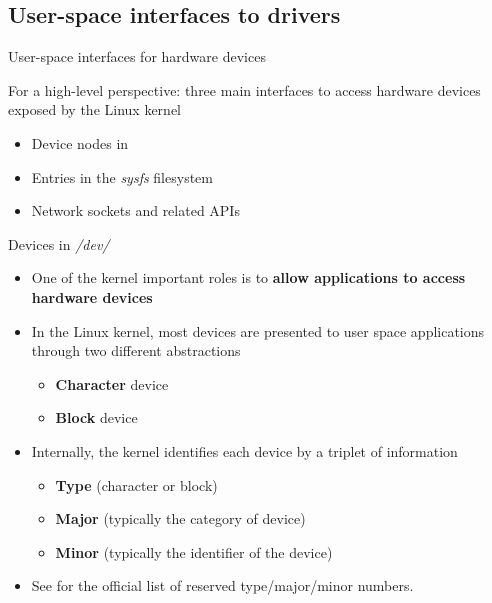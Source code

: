 \subsection{User-space interfaces to drivers}

\begin{frame}{User-space interfaces for hardware devices}

  For a high-level perspective: three main interfaces to access
  hardware devices exposed by the Linux kernel

  \begin{itemize}
  \item Device nodes in 
  \item Entries in the {\em sysfs} filesystem
  \item Network sockets and related APIs
  \end{itemize}
\end{frame}

\begin{frame}{Devices in {\em /dev/}}
  \begin{itemize}
  \item One of the kernel important roles is to {\bf allow applications
      to access hardware devices}
  \item In the Linux kernel, most devices are presented to user space
    applications through two different abstractions
    \begin{itemize}
    \item {\bf Character} device
    \item {\bf Block} device
    \end{itemize}
  \item Internally, the kernel identifies each device by a triplet of
    information
    \begin{itemize}
    \item {\bf Type} (character or block)
    \item {\bf Major} (typically the category of device)
    \item {\bf Minor} (typically the identifier of the device)
    \end{itemize}
  \item See  for the
    official list of reserved type/major/minor numbers.
  \end{itemize}
\end{frame}

